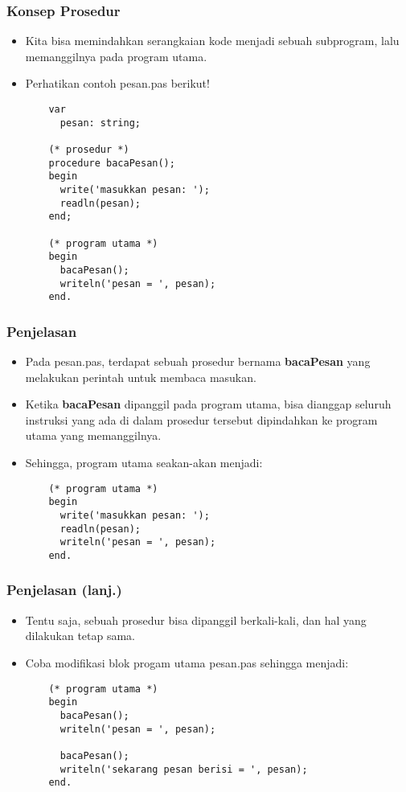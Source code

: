 \documentclass{beamer}
\begin{document}
\begin{frame}[fragile]
\frametitle{Konsep Prosedur}
\begin{itemize}
  \item Kita bisa memindahkan serangkaian kode menjadi sebuah subprogram, lalu memanggilnya pada program utama.
  \item Perhatikan contoh pesan.pas berikut!
  \begin{lstlisting}
    var
      pesan: string;

    (* prosedur *)
    procedure bacaPesan();
    begin
      write('masukkan pesan: ');
      readln(pesan);
    end;

    (* program utama *)
    begin
      bacaPesan();
      writeln('pesan = ', pesan);
    end.
  \end{lstlisting}
\end{itemize}
\end{frame}

\begin{frame}[fragile]
\frametitle{Penjelasan}
\begin{itemize}
  \item Pada pesan.pas, terdapat sebuah prosedur bernama \textbf{bacaPesan} yang melakukan perintah untuk membaca masukan.
  \item Ketika \textbf{bacaPesan} dipanggil pada program utama, bisa dianggap seluruh instruksi yang ada di dalam prosedur tersebut dipindahkan ke program utama yang memanggilnya.
  \item Sehingga, program utama seakan-akan menjadi:
  \begin{lstlisting}
    (* program utama *)
    begin
      write('masukkan pesan: ');
      readln(pesan);
      writeln('pesan = ', pesan);
    end.
  \end{lstlisting}
\end{itemize}
\end{frame}

\begin{frame}[fragile]
\frametitle{Penjelasan (lanj.)}
\begin{itemize}
  \item Tentu saja, sebuah prosedur bisa dipanggil berkali-kali, dan hal yang dilakukan tetap sama.
  \item Coba modifikasi blok progam utama pesan.pas sehingga menjadi:
  \begin{lstlisting}
    (* program utama *)
    begin
      bacaPesan();
      writeln('pesan = ', pesan);

      bacaPesan();
      writeln('sekarang pesan berisi = ', pesan);
    end.
  \end{lstlisting}
\end{itemize}
\end{frame}
\end{document}
